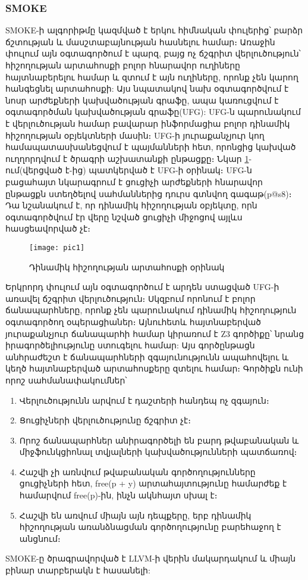 \subsubsection{SMOKE}
SMOKE\cite{Fan2019}-ի ալգորիթմը կազմված է երկու հիմնական փուլերից՝ բարձր ճշտության և մասշտաբայնության հասնելու համար։
Առաջին փուլում այն օգտագործում է պարզ, բայց ոչ ճշգրիտ վերլուծություն՝ հիշողության արտահոսքի բոլոր հնարավոր ուղիները
հայտնաբերելու համար և զտում է այն ուղիները, որոնք չեն կարող հանգեցնել արտահոսքի: Այս նպատակով նախ օգտագործվում է նոսր
արժեքների կախվածության գրաֆը, ապա կառուցվում է օգտագործման կախվածության գրաֆը(UFG): UFG-ն պարունակում է վերլուծության
համար բավարար ինֆորմացիա բոլոր դինամիկ հիշողության օբյեկտների մասին։ UFG-ի յուրաքանչյուր կող համապատասխանեցվում է պայմանների հետ,
որոնցից կախված ուղղորդվում է ծրագրի աշխատանքի ընթացքը։
Նկար \ref{fig:figure1}-ում(վերցված է\cite{Fan2019}-ից) պատկերված է UFG-ի օրինակ։ UFG-ն բացահայտ նկարագրում է ցուցիչի արժեքների հնարավոր
ընթացքն ստեղծելով սահմաններից դուրս գտնվող գագաթ(p@s8)։ Դա նշանակում է, որ դինամիկ հիշողության օբյեկտը, որն
օգտագործվում էր վերը նշված ցուցիչի միջոցով այլևս հասցեավորված չէ։

\begin{figure}[h]
    \centering
    \texttt{[image: pic1]}
    \caption{Դինամիկ հիշողության արտահոսքի օրինակ}
    \label{fig:figure1}
\end{figure}

Երկրորդ փուլում այն օգտագործում է արդեն ստացված UFG-ի առավել ճշգրիտ վերլուծություն։ Սկզբում որոնում է բոլոր
ճանապարհները, որոնք չեն պարունակում դինամիկ հիշողություն օգտագործող օպերացիաներ։ Այնուհետև հայտնաբերված յուրաքանչյուր
ճանապարհի համար կիրառում է Z3 գործիքը\cite{Z3}՝ նրանց իրագործելիությունը ստուգելու համար: Այս գործընթացն անհրաժեշտ է
ճանապարհների զգայունությունն ապահովելու և կեղծ հայտնաբերված արտահոսքերը զտելու համար։ Գործիքն ունի որոշ սահմանափակումներ՝
\begin{enumerate}[itemsep=1mm]
    \item Վերլուծությունն արվում է դաշտերի հանդեպ ոչ զգայուն։
    \item Ցուցիչների վերլուծությունը ճշգրիտ չէ։
    \item Որոշ ճանապարհներ անիրագործելի են բարդ թվաբանական և միջֆունկցիոնալ տվյալների կախվածությունների պատճառով։
    \item Հաշվի չի առնվում թվաբանական գործողությունները ցուցիչների հետ, free(p + y) արտահայտությունը համարժեք է համարվում free(p)-ին, ինչն ակնհայտ սխալ է։
    \item Հաշվի են առվում միայն այն դեպքերը, երբ դինամիկ հիշողության առանձնացման գործողությունը բարեհաջող է անցնում։
\end{enumerate}

SMOKE-ը ծրագրավորված է LLVM-ի վերին մակարդակում և միայն բինար տարբերակն է հասանելի\cite{SMOKE}:
